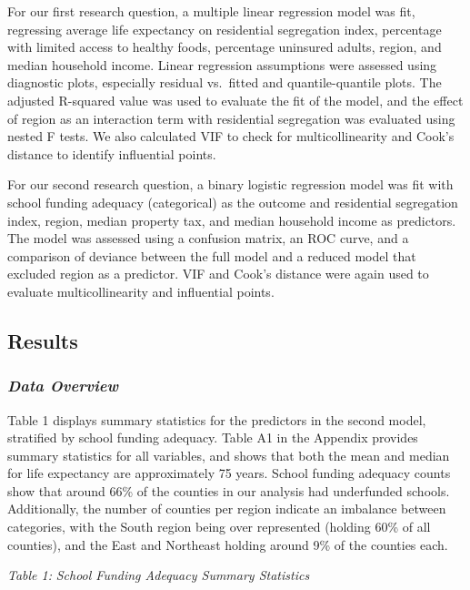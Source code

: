 \documentclass[
  10pt,
  letterpaper,
  DIV=11,
  numbers=noendperiod]{scrartcl}
\begin{document}
For our first research question, a multiple linear regression model was
fit, regressing average life expectancy on residential segregation
index, percentage with limited access to healthy foods, percentage
uninsured adults, region, and median household income. Linear regression
assumptions were assessed using diagnostic plots, especially residual
vs.~fitted and quantile-quantile plots. The adjusted R-squared value was
used to evaluate the fit of the model, and the effect of region as an
interaction term with residential segregation was evaluated using nested
F tests. We also calculated VIF to check for multicollinearity and
Cook's distance to identify influential points.~

For our second research question, a binary logistic regression model was
fit with school funding adequacy (categorical) as the outcome and
residential segregation index, region, median property tax, and median
household income as predictors. The model was assessed using a confusion
matrix, an ROC curve, and a comparison of deviance between the full
model and a reduced model that excluded region as a predictor. VIF and
Cook's distance were again used to evaluate multicollinearity and
influential points.

\subsection{Results}\label{results}

\subsubsection{\texorpdfstring{\emph{Data
Overview}}{Data Overview}}\label{data-overview}

Table 1 displays summary statistics for the predictors in the second
model, stratified by school funding adequacy. Table A1 in the Appendix
provides summary statistics for all variables, and shows that both the
mean and median for life expectancy are approximately 75 years. School
funding adequacy counts show that around 66\% of the counties in our
analysis had underfunded schools. Additionally, the number of counties
per region indicate an imbalance between categories, with the South
region being over represented (holding 60\% of all counties), and the
East and Northeast holding around 9\% of the counties each.

\newpage

\emph{Table 1:} \emph{School Funding Adequacy Summary Statistics}
\end{document}
